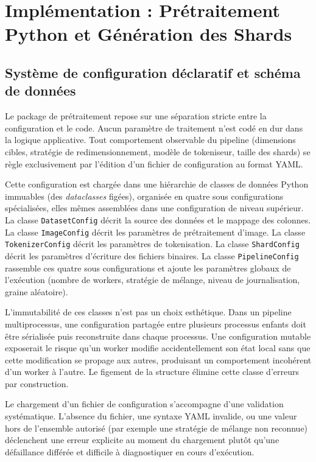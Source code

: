 \documentclass[12pt,a4paper]{report}
\begin{document}
\chapter{Implémentation : Prétraitement Python et Génération des Shards}
\label{chap:implementation_python}

\section{Système de configuration déclaratif et schéma de données}
\label{sec:config_schema}

Le package de prétraitement repose sur une séparation stricte entre la configuration et le code. Aucun paramètre de traitement n'est codé en dur dans la logique applicative. Tout comportement observable du pipeline (dimensions cibles, stratégie de redimensionnement, modèle de tokeniseur, taille des shards) se règle exclusivement par l'édition d'un fichier de configuration au format YAML.

Cette configuration est chargée dans une hiérarchie de classes de données Python immuables (des \textit{dataclasses} figées), organisée en quatre sous configurations spécialisées, elles mêmes assemblées dans une configuration de niveau supérieur. La classe \texttt{DatasetConfig} décrit la source des données et le mappage des colonnes. La classe \texttt{ImageConfig} décrit les paramètres de prétraitement d'image. La classe \texttt{TokenizerConfig} décrit les paramètres de tokenisation. La classe \texttt{ShardConfig} décrit les paramètres d'écriture des fichiers binaires. La classe \texttt{PipelineConfig} rassemble ces quatre sous configurations et ajoute les paramètres globaux de l'exécution (nombre de workers, stratégie de mélange, niveau de journalisation, graine aléatoire).

L'immutabilité de ces classes n'est pas un choix esthétique. Dans un pipeline multiprocessus, une configuration partagée entre plusieurs processus enfants doit être sérialisée puis reconstruite dans chaque processus. Une configuration mutable exposerait le risque qu'un worker modifie accidentellement son état local sans que cette modification se propage aux autres, produisant un comportement incohérent d'un worker à l'autre. Le figement de la structure élimine cette classe d'erreurs par construction.

Le chargement d'un fichier de configuration s'accompagne d'une validation systématique. L'absence du fichier, une syntaxe YAML invalide, ou une valeur hors de l'ensemble autorisé (par exemple une stratégie de mélange non reconnue) déclenchent une erreur explicite au moment du chargement plutôt qu'une défaillance différée et difficile à diagnostiquer en cours d'exécution.
\end{document}

